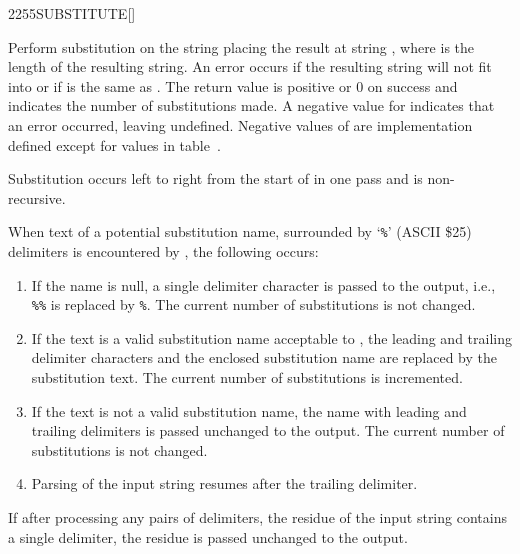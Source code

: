 \enlargethispage{6ex}
\begin{worddef}{2255}{SUBSTITUTE}[]%
\item {}

	Perform substitution on the string  placing
	the result at string , where  is
	the length of the resulting string.
	An error occurs if the resulting string will not fit into
	 or if  is the same as .
	The return value  is positive or 0 on success and indicates the
	number of substitutions made.
	A negative value for  indicates that an error occurred, leaving
	 undefined.
	Negative values of  are implementation defined except for
	values in table~.

	Substitution occurs left to right from the start of 
	in one pass and is non-recursive.

	When text of a potential substitution name, surrounded by `\texttt{\%}' (ASCII \$25) delimiters
	is encountered by , the following occurs:

	\begin{enumerate}
	\item If the name is null, a single delimiter character is passed
		to the output, i.e., \texttt{\%\%} is replaced by \texttt{\%}.
		The current number of substitutions is not changed.

	\item If the text is a valid substitution name acceptable to
		, the leading and trailing delimiter
		characters and the enclosed substitution name are replaced by
		the substitution text.  The current number of substitutions
		is incremented.

	\item If the text is not a valid substitution name, the name with
		leading	and trailing delimiters is passed unchanged to the
		output.  The current number of substitutions is not changed.

	\item Parsing of the input string resumes after the trailing delimiter.
	\end{enumerate}

	If after processing any pairs of delimiters, the residue of the input string contains
	a single delimiter, the residue is passed unchanged to the output.


\end{worddef}
